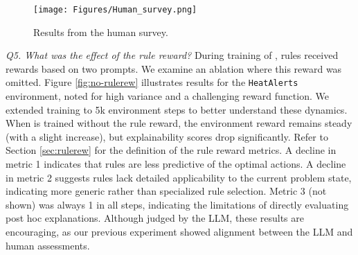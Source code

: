 \begin{figure}[tbp]
\centering
\texttt{[image: Figures/Human\_survey.png]}
\vskip-10pt
\caption{Results from the human survey.}
\label{fig:survey}
\vskip -8pt
\end{figure}


\emph{Q5. What was the effect of the rule reward?}  During training of \rbrl, rules received rewards based on two prompts. We examine an ablation where this reward was omitted. Figure \ref{fig:no-rulerew} illustrates results for the \texttt{HeatAlerts} environment, noted for high variance and a challenging reward function. We extended training to 5k environment steps to better understand these dynamics. When \rbrl is trained without the rule reward, the environment reward remains steady (with a slight increase), but explainability scores drop significantly. Refer to Section \ref{sec:rulerew} for the definition of the rule reward metrics. A decline in metric 1 indicates that rules are less predictive of the optimal actions. A decline in metric 2 suggests rules lack detailed applicability to the current problem state, indicating more generic rather than specialized rule selection. Metric 3 (not shown) was always 1 in all steps, indicating the limitations of directly evaluating post hoc explanations.  
Although judged by the LLM, these results are encouraging, as our previous experiment showed alignment between the LLM and human assessments.














